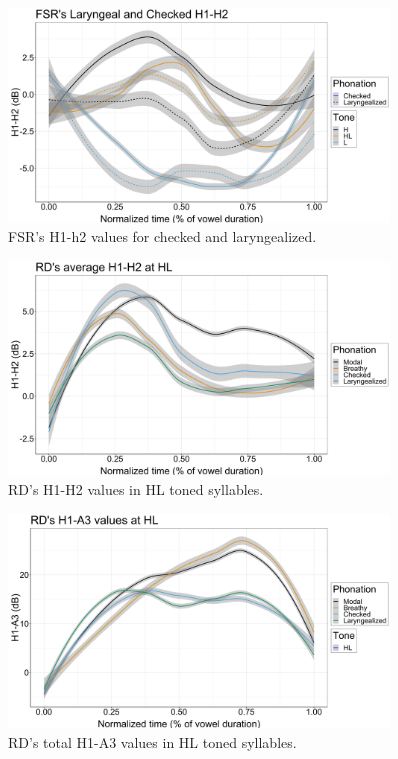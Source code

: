 \documentclass[12pt, letterpaper]{article}
\begin{document}
\begin{figure}[!ht]
	\includegraphics[width=0.9\textwidth]{../h1h2_CheckedLaryngeal.png}
	\caption{FSR's H1-h2 values for checked and laryngealized.}
	\label{fig:FSRh1h2checked} 
\end{figure}


\begin{figure}[!ht]
	\includegraphics[width=0.9\textwidth]{../RDh1h2_line_HL.png}
	\caption{RD's H1-H2 values in HL toned syllables.}
	\label{fig:RDh1h2} 
\end{figure}


\begin{figure}[!ht]
	\includegraphics[width=0.9\textwidth]{../RDH1A3_HL.png}
	\caption{RD's total H1-A3 values in HL toned syllables. }
	\label{fig:RDh1a3} 
\end{figure}
\end{document}
